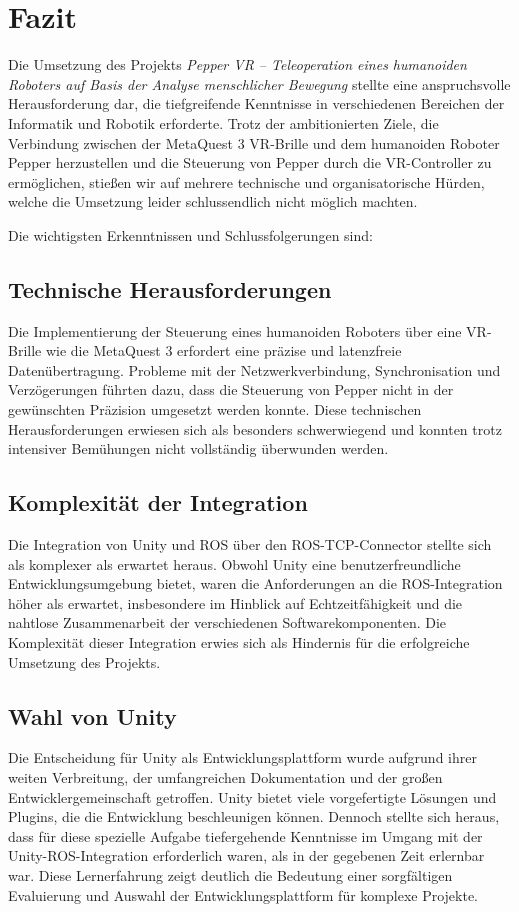 \chapter{Fazit}

Die Umsetzung des Projekts \textit{Pepper VR – Teleoperation eines humanoiden Roboters auf Basis der Analyse menschlicher Bewegung} stellte eine anspruchsvolle Herausforderung dar, die tiefgreifende Kenntnisse in verschiedenen Bereichen der Informatik und Robotik erforderte. Trotz der ambitionierten Ziele, die Verbindung zwischen der MetaQuest 3 VR-Brille und dem humanoiden Roboter Pepper herzustellen und die Steuerung von Pepper durch die VR-Controller zu ermöglichen, stießen wir auf mehrere technische und organisatorische Hürden, welche die Umsetzung leider schlussendlich nicht möglich machten.

Die wichtigsten Erkenntnissen und Schlussfolgerungen sind:

\section{Technische Herausforderungen}
Die Implementierung der Steuerung eines humanoiden Roboters über eine VR-Brille wie die MetaQuest 3 erfordert eine präzise und latenzfreie Datenübertragung. Probleme mit der Netzwerkverbindung, Synchronisation und Verzögerungen führten dazu, dass die Steuerung von Pepper nicht in der gewünschten Präzision umgesetzt werden konnte. Diese technischen Herausforderungen erwiesen sich als besonders schwerwiegend und konnten trotz intensiver Bemühungen nicht vollständig überwunden werden.

\section{Komplexität der Integration}
Die Integration von Unity und ROS über den ROS-TCP-Connector stellte sich als komplexer als erwartet heraus. Obwohl Unity eine benutzerfreundliche Entwicklungsumgebung bietet, waren die Anforderungen an die ROS-Integration höher als erwartet, insbesondere im Hinblick auf Echtzeitfähigkeit und die nahtlose Zusammenarbeit der verschiedenen Softwarekomponenten. Die Komplexität dieser Integration erwies sich als Hindernis für die erfolgreiche Umsetzung des Projekts.

\section{Wahl von Unity}
Die Entscheidung für Unity als Entwicklungsplattform wurde aufgrund ihrer weiten Verbreitung, der umfangreichen Dokumentation und der großen Entwicklergemeinschaft getroffen. Unity bietet viele vorgefertigte Lösungen und Plugins, die die Entwicklung beschleunigen können. Dennoch stellte sich heraus, dass für diese spezielle Aufgabe tiefergehende Kenntnisse im Umgang mit der Unity-ROS-Integration erforderlich waren, als in der gegebenen Zeit erlernbar war. Diese Lernerfahrung zeigt deutlich die Bedeutung einer sorgfältigen Evaluierung und Auswahl der Entwicklungsplattform für komplexe Projekte.

